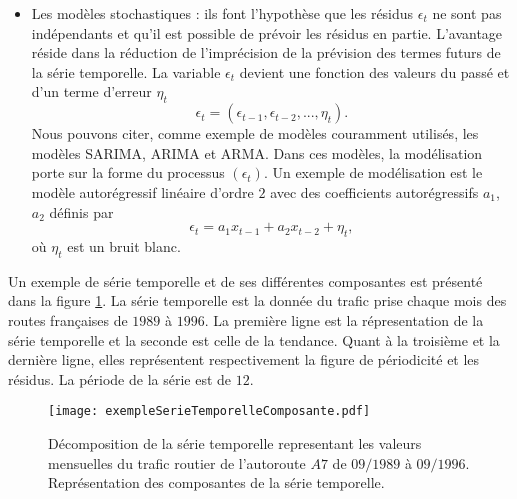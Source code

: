 \begin{itemize}
	\item Les mod\`eles stochastiques : ils font l'hypoth\`ese que les r\'esidus $\epsilon_t$ ne sont pas ind\'ependants et qu'il est possible de pr\'evoir les r\'esidus en partie. L'avantage r\'eside dans la r\'eduction de l'impr\'ecision de la pr\'evision des termes futurs de la s\'erie temporelle.  La variable $\epsilon_t$ devient une fonction des valeurs du pass\'e et d'un terme d'erreur $\eta_t$ $$\epsilon_t = (\epsilon_{t-1}, \epsilon_{t-2}, ... , \eta_{t}).$$
	Nous pouvons citer, comme exemple de mod\`eles couramment utilis\'es, les mod\`eles SARIMA, ARIMA et ARMA. Dans ces mod\`eles, la mod\'elisation porte sur la forme du processus $(\epsilon_t)$. Un exemple de mod\'elisation est le mod\`ele autor\'egressif lin\'eaire d'ordre $2$ avec des coefficients autor\'egressifs $a_1$, $a_2$ d\'efinis par 
	$$\epsilon_t = a_1 x_{t-1} + a_2 x_{t-2} + \eta_t,$$ o\`u $\eta_t$ est un bruit blanc.
\end{itemize}
Un exemple de s\'erie temporelle et de ses diff\'erentes composantes est pr\'esent\'e dans la figure \ref{exempleSerieTemporelleComposante}. La s\'erie temporelle est la donn\'ee du trafic prise chaque mois des routes fran\c caises de $1989$ \`a $1996$.
La premi\`ere ligne est la r\'epresentation de la s\'erie temporelle et la seconde est celle de la tendance. Quant \`a la troisi\`eme  et la derni\`ere ligne, elles repr\'esentent respectivement la figure de p\'eriodicit\'e et les r\'esidus. La p\'eriode de la s\'erie est de $12$.
\begin{figure}[htb!] 
\centering
\texttt{[image: exempleSerieTemporelleComposante.pdf]}
\caption{ 
	D\'ecomposition de la s\'erie temporelle representant les valeurs mensuelles du trafic routier de l'autoroute $A7$ de $09/1989$ \`a $09/1996$. Repr\'esentation des composantes de la s\'erie temporelle.} 
\label{exempleSerieTemporelleComposante}
\end{figure}

